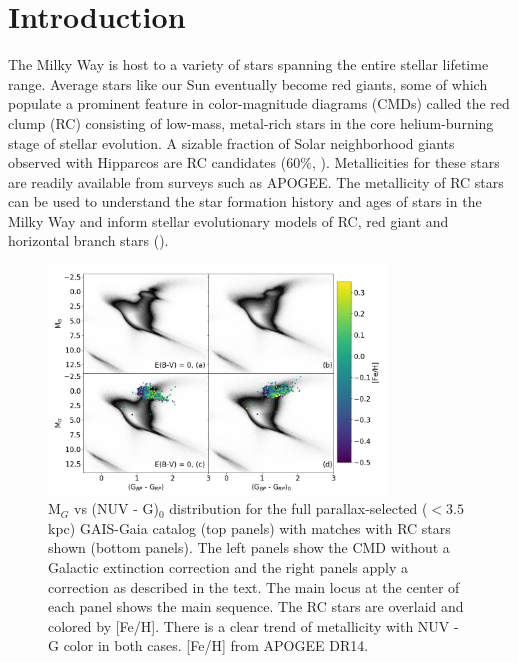 \documentclass[twocolumn]{emulateapj}
\begin{document}
\section{Introduction}
The Milky Way is host to a variety of stars spanning the entire stellar lifetime range. Average stars like our Sun eventually become red giants, some of which populate a prominent feature in color-magnitude diagrams (CMDs) called the red clump (RC) consisting of low-mass, metal-rich stars in the core helium-burning stage of stellar evolution. A sizable fraction of Solar neighborhood giants observed with Hipparcos are RC candidates (60$\%$, \citealt{girardi16}). Metallicities for these stars are readily available from surveys such as APOGEE. The metallicity of RC stars can be used to understand the star formation history and ages of stars in the Milky Way and inform stellar evolutionary models of RC, red giant and horizontal branch stars (\citealt{girardi16}).

\begin{figure}[] %
\centering
\includegraphics[width=0.8\textwidth]{f1.pdf}
\caption{M$_G$ vs (NUV - G)$_0$ distribution for the full parallax-selected ($<3.5$ kpc) GAIS-Gaia catalog  (top panels) with matches with RC stars shown (bottom panels). The left panels show the CMD without a Galactic extinction correction and the right panels apply a correction as described in the text. The main locus at the center of each panel shows the main sequence.  The RC stars are overlaid and colored by [Fe/H]. There is a clear trend of metallicity with NUV - G color in both cases. [Fe/H] from APOGEE DR14.}
\end{figure}
\end{document}
